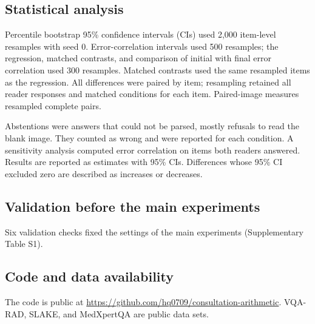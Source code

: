 \subsection{Statistical analysis}
Percentile bootstrap 95\% confidence intervals (CIs) used 2,000 item-level resamples with seed 0.
Error-correlation intervals used 500 resamples; the regression, matched contrasts, and comparison of initial with final error correlation used 300 resamples.
Matched contrasts used the same resampled items as the regression.
All differences were paired by item; resampling retained all reader responses and matched conditions for each item.
Paired-image measures resampled complete pairs.

Abstentions were answers that could not be parsed, mostly refusals to read the blank image.
They counted as wrong and were reported for each condition.
A sensitivity analysis computed error correlation on items both readers answered.
Results are reported as estimates with 95\% CIs.
Differences whose 95\% CI excluded zero are described as increases or decreases.

\subsection{Validation before the main experiments}
Six validation checks fixed the settings of the main experiments (Supplementary Table S1).

\subsection{Code and data availability}
The code is public at \url{https://github.com/hq0709/consultation-arithmetic}. VQA-RAD, SLAKE, and MedXpertQA are public data sets.
